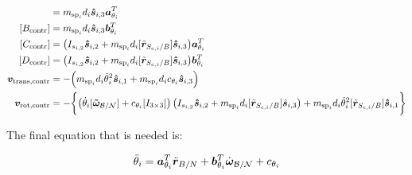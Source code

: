 \begin{align}
[A_{\textnormal{contr}}] &= m_{\text{sp}_i}d_i \bm{\hat{s}}_{i,3} \bm a_{\theta_i}^T
\\
[B_{\textnormal{contr}}] &= m_{\text{sp}_i}d_i \bm{\hat{s}}_{i,3} \bm b_{\theta_i}^T 
\\
[C_{\textnormal{contr}}] &= \big( I_{s_{i,2}}\bm{\hat{s}}_{i,2}+m_{\text{sp}_i}d_i [\tilde{\bm{r}}_{S_{c,i}/B}] \bm{\hat{s}}_{i,3}\big)\bm a_{\theta_i}^T
\\
[D_{\textnormal{contr}}] &= \big( I_{s_{i,2}}\bm{\hat{s}}_{i,2}+m_{\text{sp}_i}d_i [\tilde{\bm{r}}_{S_{c,i}/B}] \bm{\hat{s}}_{i,3}\big) \bm b_{\theta_i}^T
\\
\bm v_{\text{trans,contr}} &= -\Big(m_{\text{sp}_i}d_i \dot{\theta}_i^2 \bm{\hat{s}}_{i,1}+m_{\text{sp}_i}d_i c_{\theta_i} \bm{\hat{s}}_{i,3} \Big)
\\
\bm v_{\text{rot,contr}} &= -\biggl\lbrace\big(\dot{\theta}_i [\bm{\tilde{\omega}}_{\cal B/N}] +c_{\theta_i} [I_{3\times3}]\big) \left(I_{s_{i,2}} \bm{\hat{s}}_{i,2}+m_{\text{sp}_i} d_i [\tilde{\bm{r}}_{S_{c,i}/B}] \hat{\bm s}_{i,3}\right) +m_{\text{sp}_i}d_i\dot{\theta}_i^2[\tilde{\bm{r}}_{S_{c,i}/B}] \bm{\hat{s}}_{i,1} \biggr\rbrace 
\end{align}

The final equation that is needed is:

\begin{equation}
\ddot \theta_i = \bm a_{\theta_i}^T \ddot{\bm r}_{B/N} + \bm b_{\theta_i}^T \dot{\bm\omega}_{\cal B/N} + c_{\theta_i}
\label{eq:solar_panel_final5}
\end{equation}


